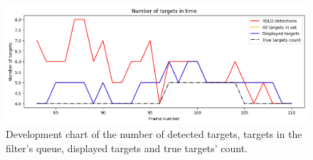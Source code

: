 \begin{figure}[H]
    \centering
    \includegraphics[width=\linewidth]{../../../experiments/E1/V2/SAM/sam_det}
    \caption{Development chart of the number of detected targets, targets in the filter's queue, displayed targets and
    true targets' count.}
    \label{gr:E1-V2-S2}
\end{figure}

